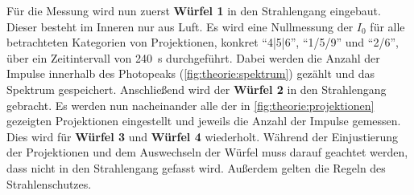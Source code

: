     Für die Messung wird nun zuerst \textbf{Würfel 1} in den Strahlengang eingebaut.
    Dieser besteht im Inneren nur aus Luft.
    Es wird eine Nullmessung der $I_0$ für alle betrachteten Kategorien von Projektionen,
    konkret \enquote{4|5|6}, \enquote{1/5/9} und \enquote{2/6},
    über ein Zeitintervall von \SI{240}{\second} durchgeführt.
    Dabei werden die Anzahl der Impulse innerhalb des Photopeaks (\autoref{fig:theorie:spektrum}) gezählt und das Spektrum gespeichert.
    Anschließend wird der \textbf{Würfel 2} in den Strahlengang gebracht.
    Es werden nun nacheinander alle der in \autoref{fig:theorie:projektionen} gezeigten Projektionen eingestellt und jeweils die Anzahl der Impulse gemessen.
    Dies wird für \textbf{Würfel 3} und \textbf{Würfel 4} wiederholt.
    Während der Einjustierung der Projektionen und dem Auswechseln der Würfel muss darauf geachtet werden,
    dass nicht in den Strahlengang gefasst wird.
    Außerdem gelten die Regeln des Strahlenschutzes.

